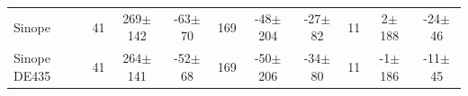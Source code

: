 \documentclass[11pt,a4paper]{report}
\begin{document}
\begin{landscape}
\begin{table}
\begin{centering}
\begin{tabular}{l|ccc|ccc|ccc}
\hdashline
Sinope  & 41 & 269$\pm$142 & -63$\pm$ 70 & 169 & -48$\pm$204 & -27$\pm$ 82 & 11 &   2$\pm$188 & -24$\pm$ 46\tabularnewline
Sinope DE435 & 41 & 264$\pm$141 & -52$\pm$ 68 & 169 & -50$\pm$206 & -34$\pm$ 80 & 11 &  -1$\pm$186 & -11$\pm$ 45 \tabularnewline
\hline
\end{tabular}
\par \end{centering}
\end{table}


\begin{figure}
\begin{centering}
\end{centering}
\end{figure}

\begin{figure}
\begin{centering}
\end{centering}
\end{figure}


\end{landscape}
\end{document}
